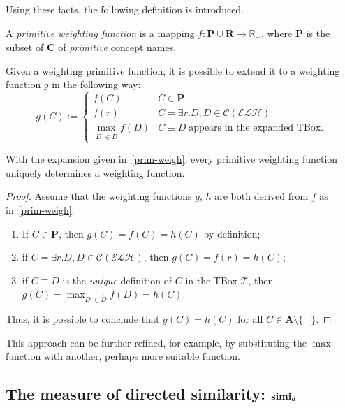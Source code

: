   Using these facts, the following definition is introduced.
  \begin{definition}
    A \emph{primitive weighting function} is a mapping \(f \colon \mathbf{P} \cup \mathbf{R} \to \mathbb{R}_+\), where \(\mathbf{P}\) is the subset of \(\mathbf{C}\) of \emph{primitive} concept names.
  \end{definition}
  Given a weighting primitive function, it is possible to extend it to a weighting function \(g\) in the following way:
  \begin{equation}\label{prim-weigh}
    g(C) :=
    \begin{cases}
      f(C) & C \in \mathbf{P} \\
      f(r) & C = \exists{}r.D, D \in \mathcal{C}(\mathcal{ELH}) \\
      \max_{D^\prime \in \widehat{D}}f(D) & C \equiv D \; \text{appears in the expanded TBox.}
    \end{cases}
  \end{equation}
  \begin{proposition}
    With the expansion given in~\eqref{prim-weigh}, every primitive weighting function uniquely determines a weighting function.
  \end{proposition}
  \begin{proof}
    Assume that the weighting functions \(g\), \(h\) are both derived from \(f\) as in~\eqref{prim-weigh}.
    \begin{enumerate}
      \item If \(C \in \mathbf{P}\), then
      \(g(C) = f(C) = h(C)\) by definition;
      \item if \(C =  \exists{}r.D, D \in \mathcal{C}(\mathcal{ELH})\), then \(g(C) = f(r) = h(C)\);
      \item if \(C \equiv D\) is the \emph{unique} definition of \(C\) in the TBox \(\mathcal{T}\), then
      \(g(C) = \max_{D^\prime \in \widehat{D}}f(D) = h(C)\).
    \end{enumerate}
    Thus, it is possible to conclude that \(g(C) = h(C)\) for all \(C \in \mathbf{A} \setminus \lbrace \top \rbrace\).
  \end{proof}
  This approach can be further refined, for example, by substituting the \(\max\) function with another, perhaps more suitable function.

\subsection{The measure of directed similarity: \(\operatorname{\mathbf{simi}}_d\)}

